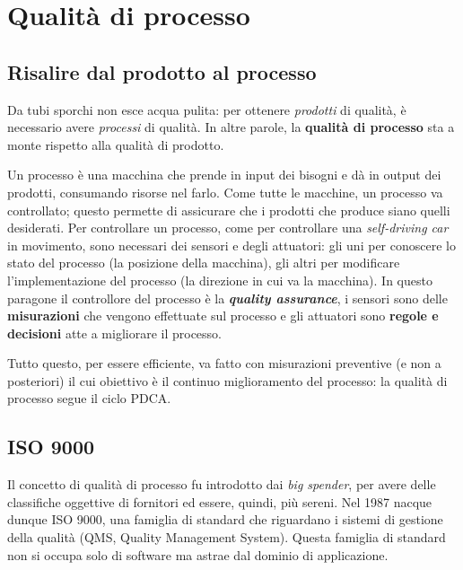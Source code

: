 \documentclass[a4paper]{article}
\begin{document}
	


		
	\section{Qualità di processo}


		
	\subsection{Risalire dal prodotto al processo}

		
Da tubi sporchi non esce acqua pulita: per ottenere \emph{prodotti} di qualità, è necessario avere \emph{processi} di qualità. In altre parole, la \textbf{qualità di processo} sta a monte rispetto alla qualità di prodotto.
		
Un processo è una macchina che prende in input dei bisogni e dà in output dei prodotti, consumando risorse nel farlo. Come tutte le macchine, un processo va controllato; questo permette di assicurare che i prodotti che produce siano quelli desiderati. Per controllare un processo, come per controllare una \emph{self-driving car} in movimento, sono necessari dei sensori e degli attuatori: gli uni per conoscere lo stato del processo (la posizione della macchina), gli altri per modificare l'implementazione del processo (la direzione in cui va la macchina). In questo paragone il controllore del processo è la \textbf{\emph{quality assurance}}, i sensori sono delle \textbf{misurazioni} che vengono effettuate sul processo e gli attuatori sono \textbf{regole e decisioni} atte a migliorare il processo.
		
Tutto questo, per essere efficiente, va fatto con misurazioni preventive (e non a posteriori) il cui obiettivo è il continuo miglioramento del processo: la qualità di processo segue il ciclo PDCA.

		
	\subsection{ISO 9000}

		
Il concetto di qualità di processo fu introdotto dai \emph{big spender}, per avere delle classifiche oggettive di fornitori ed essere, quindi, più sereni. Nel 1987 nacque dunque ISO 9000, una famiglia di standard che riguardano i sistemi di gestione della qualità (QMS, Quality Management System). Questa famiglia di standard non si occupa solo di software ma astrae dal dominio di applicazione.
		
\end{document}
